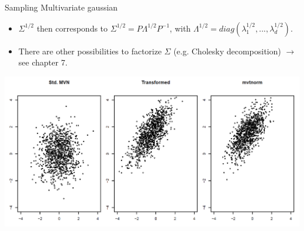 \documentclass[11pt,compress,t,notes=noshow, xcolor=table]{beamer}
\begin{document}
\begin{vbframe}{Sampling Multivariate gaussian}
\begin{itemize}
\item $\Sigma^{1/2}$ then corresponds to $\Sigma^{1/2}=P\Lambda^{1/2} P^{-1}$, with $\Lambda^{1/2}=diag(\lambda_1^{1/2},..., \lambda_d^{1/2})$.

\lz

\item There are other possibilities to factorize $\Sigma$ (e.g. Cholesky decomposition) $\to$ see chapter 7.
\end{itemize}
\framebreak

\lz 

\begin{center}
\includegraphics[width =1\textwidth]{figure_man/multigaussian.png}
\end{center}


\end{vbframe}
\end{document}
